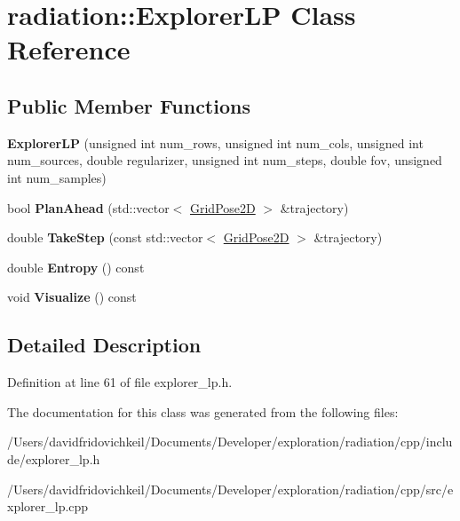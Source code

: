 \hypertarget{classradiation_1_1_explorer_l_p}{}\section{radiation\+:\+:Explorer\+LP Class Reference}
\label{classradiation_1_1_explorer_l_p}
\subsection*{Public Member Functions}
\begin{DoxyCompactItemize}
\item 
\hypertarget{classradiation_1_1_explorer_l_p_a3d37154001011ae4a81c5ee7d26b8f62}{}\label{classradiation_1_1_explorer_l_p_a3d37154001011ae4a81c5ee7d26b8f62} 
{\bfseries Explorer\+LP} (unsigned int num\+\_\+rows, unsigned int num\+\_\+cols, unsigned int num\+\_\+sources, double regularizer, unsigned int num\+\_\+steps, double fov, unsigned int num\+\_\+samples)
\item 
\hypertarget{classradiation_1_1_explorer_l_p_accde83eac496f12dede4737b8a57ce51}{}\label{classradiation_1_1_explorer_l_p_accde83eac496f12dede4737b8a57ce51} 
bool {\bfseries Plan\+Ahead} (std\+::vector$<$ \hyperlink{classradiation_1_1_grid_pose2_d}{Grid\+Pose2D} $>$ \&trajectory)
\item 
\hypertarget{classradiation_1_1_explorer_l_p_a03eb9498dfac2ffe70300ce142d1f355}{}\label{classradiation_1_1_explorer_l_p_a03eb9498dfac2ffe70300ce142d1f355} 
double {\bfseries Take\+Step} (const std\+::vector$<$ \hyperlink{classradiation_1_1_grid_pose2_d}{Grid\+Pose2D} $>$ \&trajectory)
\item 
\hypertarget{classradiation_1_1_explorer_l_p_ac5a2b2b72a4259140eb5d823a3aab30f}{}\label{classradiation_1_1_explorer_l_p_ac5a2b2b72a4259140eb5d823a3aab30f} 
double {\bfseries Entropy} () const
\item 
\hypertarget{classradiation_1_1_explorer_l_p_a28bebeeb56b264682bfea5ed03b3087a}{}\label{classradiation_1_1_explorer_l_p_a28bebeeb56b264682bfea5ed03b3087a} 
void {\bfseries Visualize} () const
\end{DoxyCompactItemize}


\subsection{Detailed Description}


Definition at line 61 of file explorer\+\_\+lp.\+h.



The documentation for this class was generated from the following files\+:\begin{DoxyCompactItemize}
\item 
/\+Users/davidfridovichkeil/\+Documents/\+Developer/exploration/radiation/cpp/include/explorer\+\_\+lp.\+h\item 
/\+Users/davidfridovichkeil/\+Documents/\+Developer/exploration/radiation/cpp/src/explorer\+\_\+lp.\+cpp\end{DoxyCompactItemize}
